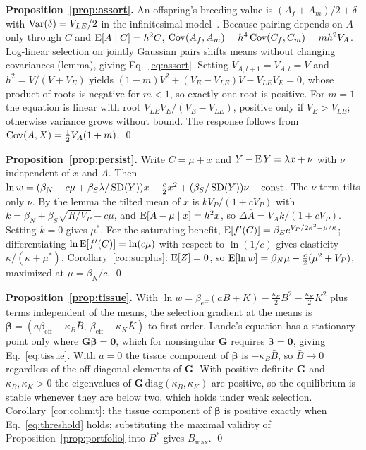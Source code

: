 \textbf{Proposition~\ref{prop:assort}.} An offspring's breeding value is $(A_f+A_m)/2+\delta$ with $\operatorname{Var}(\delta)=V_{LE}/2$ in
the infinitesimal model~\cite{bulmer1980}. Because pairing depends on $A$ only through $C$ and $\operatorname{E}[A\mid C]=h^2C$,
$\operatorname{Cov}(A_f,A_m)=h^4\operatorname{Cov}(C_f,C_m)=mh^2V_A$. Log-linear selection on jointly Gaussian pairs shifts means without changing
covariances (lemma), giving Eq.~\eqref{eq:assort}. Setting $V_{A,t+1}=V_{A,t}=V$ and $h^2=V/(V+V_E)$ yields
$(1-m)V^2+(V_E-V_{LE})V-V_{LE}V_E=0$, whose product of roots is negative for $m<1$, so exactly one root is positive. For
$m=1$ the equation is linear with root $V_{LE}V_E/(V_E-V_{LE})$, positive only if $V_E>V_{LE}$; otherwise variance grows
without bound. The response follows from $\operatorname{Cov}(A,X)=\tfrac12V_A(1+m)$. \qed

\textbf{Proposition~\ref{prop:persist}.} Write $C=\mu+x$ and $Y-\operatorname{E} Y=\lambda x+\nu$ with $\nu$ independent of $x$ and $A$.
Then $\ln w=(\beta_N-c\mu+\beta_S\lambda/\operatorname{SD}(Y))x-\tfrac c2x^2+(\beta_S/\operatorname{SD}(Y))\nu+\text{const}$. The $\nu$ term tilts only
$\nu$. By the lemma the tilted mean of $x$ is $kV_P/(1+cV_P)$ with $k=\beta_N+\beta_S\sqrt{R/V_P}-c\mu$, and
$\operatorname{E}[A-\mu\mid x]=h^2x$, so $\Delta\bar A=V_Ak/(1+cV_P)$. Setting $k=0$ gives $\mu^*$. For the saturating benefit,
$\operatorname{E}[f'(C)]=\beta_Ee^{V_P/2\kappa^2-\mu/\kappa}$; differentiating $\ln\operatorname{E}[f'(C)]=\ln(c\mu)$ with respect to $\ln(1/c)$ gives
elasticity $\kappa/(\kappa+\mu^*)$. Corollary~\ref{cor:surplus}: $\operatorname{E}[Z]=0$, so $\operatorname{E}[\ln w]=\beta_N\mu-\tfrac c2(\mu^2+V_P)$,
maximized at $\mu=\beta_N/c$. \qed

\textbf{Proposition~\ref{prop:tissue}.} With $\ln w=\beta_{\mathrm{eff}}(aB+K)-\tfrac{\kappa_B}2B^2-\tfrac{\kappa_K}2K^2$ plus
terms independent of the means, the selection gradient at the means is
$\bm\beta=(a\beta_{\mathrm{eff}}-\kappa_B\bar B,\ \beta_{\mathrm{eff}}-\kappa_K\bar K)$ to first order. Lande's equation has a
stationary point only where $\mathbf G\bm\beta=\mathbf 0$, which for nonsingular $\mathbf G$ requires $\bm\beta=\mathbf 0$,
giving Eq.~\eqref{eq:tissue}. With $a=0$ the tissue component of $\bm\beta$ is $-\kappa_B\bar B$, so $\bar B\to0$ regardless
of the off-diagonal elements of $\mathbf G$. With positive-definite $\mathbf G$ and $\kappa_B,\kappa_K>0$ the eigenvalues of
$\mathbf G\,\mathrm{diag}(\kappa_B,\kappa_K)$ are positive, so the equilibrium is stable whenever they are below two, which
holds under weak selection. Corollary~\ref{cor:colimit}: the tissue component of $\bm\beta$ is positive exactly when
Eq.~\eqref{eq:threshold} holds; substituting the maximal validity of Proposition~\ref{prop:portfolio} into $B^*$ gives
$B_{\max}$. \qed

